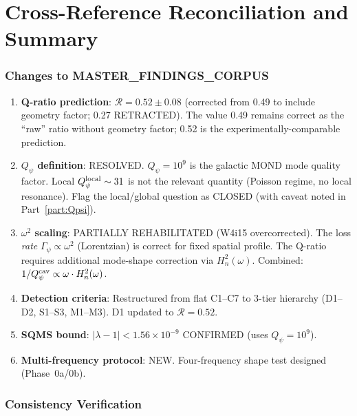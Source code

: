 \documentclass[11pt]{article}
\newcommand{\lbone}{|\lambda - 1|}
\newcommand{\ee}[1]{\times 10^{#1}}
\theoremstyle{definition}
\theoremstyle{remark}
\begin{document}
\part{Cross-Reference Reconciliation and Summary}
\label{part:summary}


\section{Changes to MASTER\_FINDINGS\_CORPUS}

\begin{enumerate}
\item \textbf{Q-ratio prediction}: $\mathcal{R} = 0.52 \pm 0.08$
  (corrected from 0.49 to include geometry factor; 0.27 RETRACTED).
  The value 0.49 remains correct as the ``raw'' ratio without
  geometry factor; 0.52 is the experimentally-comparable prediction.

\item \textbf{$Q_\psi$ definition}: RESOLVED. $Q_\psi = 10^9$ is the
  galactic MOND mode quality factor. Local $Q_\psi^{\rm local} \sim 31$
  is not the relevant quantity (Poisson regime, no local resonance).
  Flag the local/global question as CLOSED (with caveat noted in
  Part~\ref{part:Qpsi}).

\item \textbf{$\omega^2$ scaling}: PARTIALLY REHABILITATED (W4i15
  overcorrected). The loss \emph{rate} $\Gamma_\psi \propto \omega^2$
  (Lorentzian) is correct for fixed spatial profile. The Q-ratio
  requires additional mode-shape correction via $H_n^2(\omega)$.
  Combined: $1/Q_\psi^{\rm cav} \propto \omega \cdot H_n^2(\omega)$.

\item \textbf{Detection criteria}: Restructured from flat C1--C7 to
  3-tier hierarchy (D1--D2, S1--S3, M1--M3). D1 updated to
  $\mathcal{R} = 0.52$.

\item \textbf{SQMS bound}: $\lbone < 1.56\ee{-9}$ CONFIRMED
  (uses $Q_\psi = 10^9$).

\item \textbf{Multi-frequency protocol}: NEW. Four-frequency shape
  test designed (Phase~0a/0b).
\end{enumerate}


\section{Consistency Verification}
\end{document}
